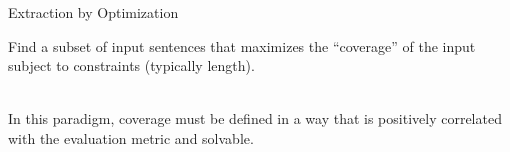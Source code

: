 \documentclass[xcolor={table}]{beamer}
\begin{document}
\begin{frame}{
    }
\begin{figure}[!h]
 \end{figure}
\end{frame}

\begin{frame}{Extraction by Optimization} 

Find a subset of input sentences that maximizes the ``coverage'' of the input
subject to constraints (typically length).

~\\

In this paradigm, coverage must be defined in a way that is positively 
correlated with the evaluation metric and solvable. 

\end{frame}
\end{document}
